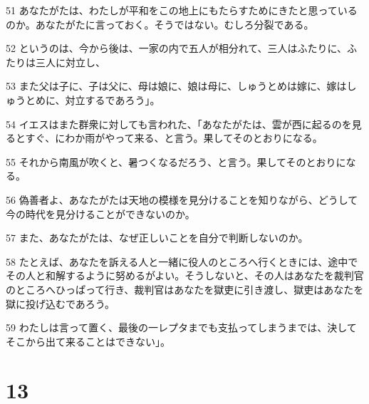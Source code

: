 \par 51 あなたがたは、わたしが平和をこの地上にもたらすためにきたと思っているのか。あなたがたに言っておく。そうではない。むしろ分裂である。
\par 52 というのは、今から後は、一家の内で五人が相分れて、三人はふたりに、ふたりは三人に対立し、
\par 53 また父は子に、子は父に、母は娘に、娘は母に、しゅうとめは嫁に、嫁はしゅうとめに、対立するであろう」。
\par 54 イエスはまた群衆に対しても言われた、「あなたがたは、雲が西に起るのを見るとすぐ、にわか雨がやって来る、と言う。果してそのとおりになる。
\par 55 それから南風が吹くと、暑つくなるだろう、と言う。果してそのとおりになる。
\par 56 偽善者よ、あなたがたは天地の模様を見分けることを知りながら、どうして今の時代を見分けることができないのか。
\par 57 また、あなたがたは、なぜ正しいことを自分で判断しないのか。
\par 58 たとえば、あなたを訴える人と一緒に役人のところへ行くときには、途中でその人と和解するように努めるがよい。そうしないと、その人はあなたを裁判官のところへひっぱって行き、裁判官はあなたを獄吏に引き渡し、獄吏はあなたを獄に投げ込むであろう。
\par 59 わたしは言って置く、最後の一レプタまでも支払ってしまうまでは、決してそこから出て来ることはできない」。

\chapter{13}

